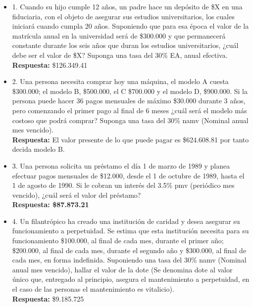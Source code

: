 \begin{itemize}
	
	\item 1. Cuando su hijo cumple 12 años, un padre hace un depósito de \$X en una fiduciaria, con el objeto de asegurar sus estudios universitarios, los cuales iniciará cuando cumpla 20 años. Suponiendo que para esa época el valor de la matrícula anual en la universidad será de \$300.000 y que permanecerá constante durante los seis años que duran los estudios universitarios, ¿cuál debe ser el valor de \$X? Suponga una tasa del 30\% EA, anual efectiva.\\
	\textbf{Respuesta:} \$126.349.41\\
	\medskip
	
	\item 2. Una persona necesita comprar hoy una máquina, el modelo A cuesta \$300.000; el modelo B, \$500.000, el C \$700.000 y el modelo D, \$900.000. Si la persona puede hacer 36 pagos mensuales de máximo \$30.000 durante 3 años, pero comenzando el primer pago al final de 6 meses ¿cuál será el modelo más costoso que podrá comprar? Suponga una tasa del 30\% namv (Nominal anual mes vencido).\\
	\textbf{Respuesta:} El valor presente de lo que puede pagar es \$624.608.81 por tanto decida modelo B.\\
	\medskip
	
	\item 3. Una persona solicita un préstamo el día 1 de marzo de 1989 y planea efectuar pagos mensuales de \$12.000, desde el 1 de octubre de 1989, hasta el 1 de agosto de 1990. Si le cobran un interés del 3.5\% pmv (periódico mes vencido), ¿cuál será el valor del préstamo?\\
	\textbf{Respuesta: \$87.873.21}\\
	\medskip
	
	\item 4. Un filantrópico ha creado una institución de caridad y desea asegurar su funcionamiento a perpetuidad. Se estima que esta institución necesita para su funcionamiento \$100.000, al final de cada mes, durante el primer año; \$200.000, al final de cada mes, durante el segundo año y \$300.000, al final de cada mes, en forma indefinida. Suponiendo una tasa del 30\% namv (Nominal anual mes vencido), hallar el valor de la dote (Se denomina dote al valor único que, entregado al principio, asegura el mantenimiento a perpetuidad, en el caso de las personas el mantenimiento es vitalicio).\\
	\textbf{Respuesta:} \$9.185.725\\
	\medskip
	

\end{itemize}
